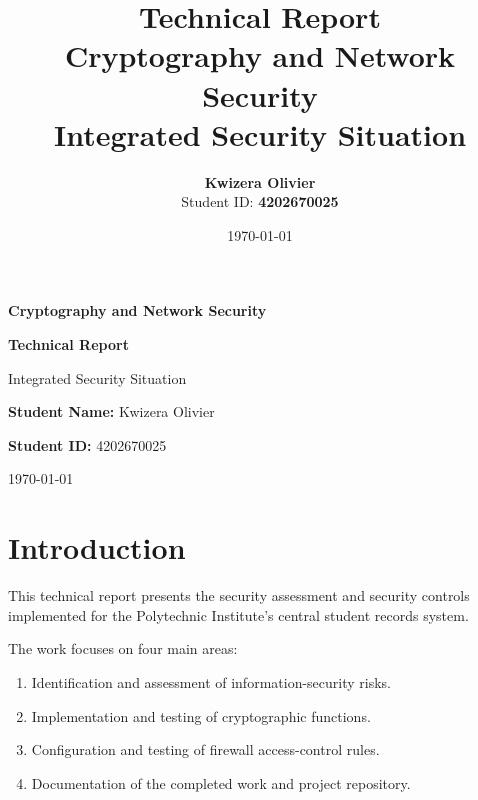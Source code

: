 \documentclass[12pt,a4paper]{article}
\title{
    \textbf{Technical Report}\\[0.3cm]
    \large Cryptography and Network Security\\
    \large Integrated Security Situation
}
\author{
    \textbf{Kwizera Olivier}\\
    Student ID: \textbf{4202670025}
}
\date{\today}
\begin{document}
\begin{titlepage}

\centering

\vspace*{3cm}

{\Large \textbf{Cryptography and Network Security}\par}

\vspace{1.5cm}

{\Huge \textbf{Technical Report}\par}

\vspace{0.7cm}

{\Large Integrated Security Situation\par}

\vspace{2.5cm}

{\large
\textbf{Student Name:} Kwizera Olivier
\par}

\vspace{0.4cm}

{\large
\textbf{Student ID:} 4202670025
\par}

\vspace{0.4cm}

\vfill

{\large \today\par}

\end{titlepage}


\section{Introduction}

This technical report presents the security assessment and security controls implemented for the Polytechnic Institute's central student records system.

The work focuses on four main areas:

\begin{enumerate}
    \item Identification and assessment of information-security risks.
    \item Implementation and testing of cryptographic functions.
    \item Configuration and testing of firewall access-control rules.
    \item Documentation of the completed work and project repository.
\end{enumerate}
\end{document}

